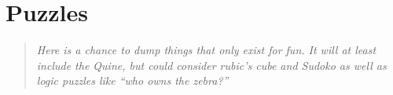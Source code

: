 \section{Puzzles}
\begin{quotation}\textit{
Here is a chance to dump things that only exist for fun. It will
at least include the Quine, but could consider rubic's cube and
Sudoko as well as logic puzzles like ``who owns the zebra?''
}\end{quotation}

